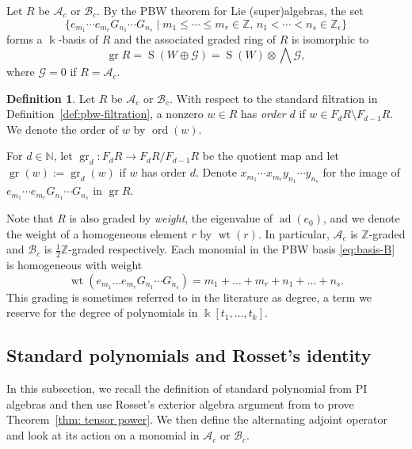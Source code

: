 \documentclass[12pt]{amsart}
\theoremstyle{plain}
\theoremstyle{definition}
\newtheorem{definition}[theorem]{Definition}
\numberwithin{equation}{theorem}
\newcommand{\kk}{\Bbbk}
\newcommand{\Sa}{\operatorname{S}}
\newcommand{\ad}{\operatorname{ad}}
\newcommand{\gr}{\operatorname{gr}}
\newcommand{\NN}{\mathbb{N}}
\newcommand{\ZZ}{\mathbb{Z}}
\newcommand{\mc}[1]{\mathcal{#1}}
\newcommand{\calA}{\mathcal A}
\newcommand{\calB}{\mathcal B}
\newcommand{\wt}{\operatorname{wt}}
\newcommand{\ord}{\operatorname{ord}}
\begin{document}
Let $R$ be $\calA_c$ or $\calB_c$.
By the PBW theorem for Lie (super)algebras, the set
\begin{equation}\label{eq:basis-B}
\bigl\{ e_{m_1} \cdots e_{m_r} G_{n_1} \cdots G_{n_s} \mid  m_1 \le \cdots \le m_r \in \ZZ, \, n_1 < \cdots < n_s \in \ZZ_\epsilon \bigr\}
\end{equation}
forms a $\kk$-basis of $R$ and the associated graded ring of $R$ is isomorphic to
\[\gr R = \Sa(W \oplus \mathcal{G}) = \Sa(W) \otimes \bigwedge \mathcal{G}, \]
where $\mc{G} = 0$ if $R = \calA_c$.
\begin{definition}\label{def: order and weight}
    Let $R$ be $\calA_c$ or $\calB_c$. With respect to the standard filtration in Definition~\ref{def:pbw-filtration}, a nonzero $w \in R$ has \emph{order} $d$ if $w \in F_d R \setminus F_{d-1} R$. We denote the order of $w$ by $\ord(w)$. 

    For $d \in \NN$, let $\gr_d: F_d R \to F_d R / F_{d-1} R$ be the quotient map and let $\gr(w) := \gr_d(w)$ if $w$ has order $d$. 
    Denote $x_{m_1} \cdots x_{m_r} y_{n_1} \cdots y_{n_s}$ for the image of $ e_{m_1} \cdots e_{m_r} G_{n_1} \cdots G_{n_s}$ in $\gr R$. 

    Note that $R$ is also graded by \emph{weight}, the eigenvalue of $\ad(e_0)$, and we denote the weight of a homogeneous element $r$ by $\wt(r)$. In particular, $\calA_c$ is $\ZZ$-graded and $\calB_c$ is $\frac{1}{2}\ZZ$-graded respectively. Each monomial in the PBW basis \eqref{eq:basis-B} is homogeneous with weight 
    \[\wt(e_{m_1} \dots e_{m_r} G_{n_1} \cdots G_{n_s}) = m_1 + \dots + m_r + n_1 + \dots + n_s.\]
    This grading is sometimes referred to in the literature as degree, a term we reserve for the degree of polynomials in $ \kk[t_1, \dots, t_k]$.
\end{definition}

\subsection{Standard polynomials and Rosset's identity}\label{sec:alternants}
In this subsection, we recall the definition of standard polynomial from PI algebras and then use Rosset's exterior algebra argument from \cite{Rosset76} to prove Theorem~\ref{thm: tensor power}. We then define the alternating adjoint operator and look at its action on a monomial in $\calA_c$ or $\calB_c$.
\end{document}
